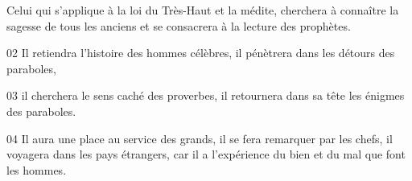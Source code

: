 Celui qui s’applique à la loi du Très-Haut et la médite, cherchera à connaître la sagesse de tous les anciens et se consacrera à la lecture des prophètes.

02 Il retiendra l’histoire des hommes célèbres, il pénètrera dans les détours des paraboles,

03 il cherchera le sens caché des proverbes, il retournera dans sa tête les énigmes des paraboles.

04 Il aura une place au service des grands, il se fera remarquer par les chefs, il voyagera dans les pays étrangers, car il a l’expérience du bien et du mal que font les hommes.
